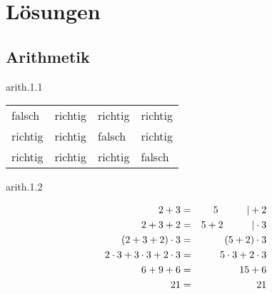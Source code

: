 \chapter{Lösungen}


\section{Arithmetik}
\begin{sol}{arith.1.1}
\begin{center}
\begin{tabular}{C{2cm}C{2cm}C{2cm}C{2cm}}
falsch & richtig & richtig & richtig \\
richtig & richtig & falsch & richtig \\
richtig & richtig & richtig & falsch
\end{tabular}
\end{center}
\end{sol}


\begin{sol}{arith.1.2}

\begin{eqnarray*}
2+3 &=& 5 \hskip 1cm | +2 \\
2+3+2 &=& 5+2 \hskip 1cm | \cdot 3 \\
(2+3+2) \cdot 3 &=& (5+2)\cdot 3 \\
2\cdot 3 + 3\cdot 3 + 2\cdot 3 &=& 5\cdot 3 +2 \cdot 3 \\
6+9+6 &=& 15 + 6 \\
21 &=& 21
\end{eqnarray*}

\end{sol}
